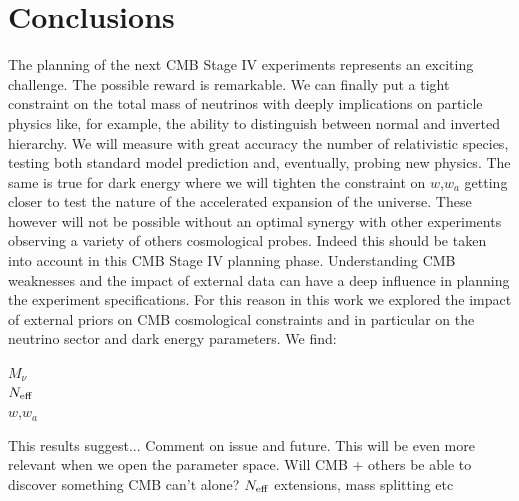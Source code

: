 \documentclass[aps,prd,reprint,superscriptaddress]{revtex4-1}
\begin{document}
\section{Conclusions  \label{sec:conclusions}}
The planning of the next CMB Stage IV experiments represents an exciting challenge. The possible reward is remarkable. We can finally put a tight constraint on the total mass of neutrinos with deeply implications on particle physics like, for example, the ability to distinguish between normal and inverted hierarchy. We will measure with great accuracy the number of relativistic species, testing both standard model prediction and, eventually, probing new physics. The same is true for dark energy where we will tighten the constraint on $w$,$w_{a}$ getting closer to test the nature of the accelerated expansion of the universe. These however will not be possible without an optimal synergy with other experiments observing a variety of others cosmological probes.
Indeed this should be taken into account in this CMB Stage IV planning phase. Understanding CMB weaknesses and the impact of external data can have a deep influence in planning the experiment specifications.
For this reason in this work we explored the impact of external priors on CMB cosmological constraints and in particular on the neutrino sector and dark energy parameters.
We find:
\begin{description}
\item[$M_{\nu}$] 
\item[$N_{\rm eff}$] 
\item[$w$,$w_{a}$] 
\end{description}

This results suggest...
Comment on issue and future. This will be even more relevant when we open the parameter space. Will CMB + others be able to discover something CMB can't alone? $N_{\rm eff}$ extensions, mass splitting etc




%
\end{document}
